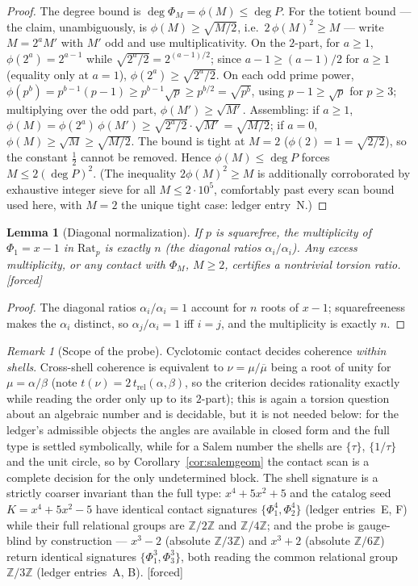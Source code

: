\documentclass[11pt]{article}
\theoremstyle{plain}
\newtheorem{lemma}[theorem]{Lemma}
\theoremstyle{definition}
\theoremstyle{remark}
\newtheorem{remark}[theorem]{Remark}
\newcommand{\Z}{\mathbb{Z}}
\newcommand{\Rat}{\mathrm{Rat}}
\newcommand{\F}{\textnormal{[forced]}}
\begin{document}
\begin{proof}
The degree bound is $\deg\Phi_M=\phi(M)\le\deg P$. For the totient
bound --- the claim, unambiguously, is $\phi(M)\ge\sqrt{M/2}$, i.e.\
$2\,\phi(M)^2\ge M$ --- write $M=2^aM'$ with $M'$ odd and use
multiplicativity. On the $2$-part, for $a\ge1$,
$\phi(2^a)=2^{a-1}$ while $\sqrt{2^a/2}=2^{(a-1)/2}$; since
$a-1\ge(a-1)/2$ for $a\ge1$ (equality only at $a=1$),
$\phi(2^a)\ge\sqrt{2^a/2}$.
On each odd prime power, $\phi(p^b)=p^{b-1}(p-1)\ge p^{b-1}\sqrt p\ge
p^{b/2}=\sqrt{p^b}$, using $p-1\ge\sqrt p$ for $p\ge3$; multiplying over
the odd part, $\phi(M')\ge\sqrt{M'}$. Assembling: if $a\ge1$,
$\phi(M)=\phi(2^a)\,\phi(M')\ge\sqrt{2^a/2}\cdot\sqrt{M'}=\sqrt{M/2}$;
if $a=0$, $\phi(M)\ge\sqrt M\ge\sqrt{M/2}$. The bound is tight at $M=2$
($\phi(2)=1=\sqrt{2/2}$), so the constant $\tfrac12$ cannot be removed.
Hence $\phi(M)\le\deg P$ forces $M\le2(\deg P)^2$. (The inequality
$2\phi(M)^2\ge M$ is additionally corroborated by exhaustive integer sieve
for all $M\le2\cdot10^{5}$, comfortably past every scan bound used here,
with $M=2$ the unique tight case: ledger entry~N.)
\end{proof}

\begin{lemma}[Diagonal normalization]\label{lem:diag}
If $p$ is squarefree, the multiplicity of $\Phi_1=x-1$ in $\Rat_p$ is exactly
$n$ (the diagonal ratios $\alpha_i/\alpha_i$). Any excess multiplicity, or any
contact with $\Phi_M$, $M\ge2$, certifies a nontrivial torsion ratio. \F
\end{lemma}

\begin{proof}
The diagonal ratios $\alpha_i/\alpha_i=1$ account for $n$ roots of $x-1$;
squarefreeness makes the $\alpha_i$ distinct, so $\alpha_j/\alpha_i=1$ iff
$i=j$, and the multiplicity is exactly $n$.
\end{proof}

\begin{remark}[Scope of the probe]\label{rem:scope}
Cyclotomic contact decides coherence \emph{within shells}. Cross-shell
coherence is equivalent to $\nu=\mu/\overline{\mu}$ being a root of unity for
$\mu=\alpha/\beta$ (note $t(\nu)=2\,t_{\mathrm{rel}}(\alpha,\beta)$, so the
criterion decides rationality exactly while reading the order only up to its
$2$-part); this is again a torsion question about an algebraic number and is
decidable, but it is not needed below: for the ledger's admissible objects the
angles are available in closed form and the full type is settled symbolically,
while for a Salem number the shells are $\{\tau\}$, $\{1/\tau\}$ and the unit
circle, so by Corollary~\ref{cor:salemgeom} the contact scan is a complete
decision for the only undetermined block. The shell signature is a strictly
coarser invariant than the full type: $x^4+5x^2+5$ and the catalog seed
$K=x^4+5x^2-5$ have identical contact signatures $\{\Phi_1^4,\Phi_2^4\}$
(ledger entries~E, F) while their full relational groups are $\Z/2\Z$ and
$\Z/4\Z$; and the probe is gauge-blind by construction --- $x^3-2$ (absolute
$\Z/3\Z$) and $x^3+2$ (absolute $\Z/6\Z$) return identical signatures
$\{\Phi_1^3,\Phi_3^3\}$, both reading the common relational group $\Z/3\Z$
(ledger entries~A, B). \F
\end{remark}
\end{document}
